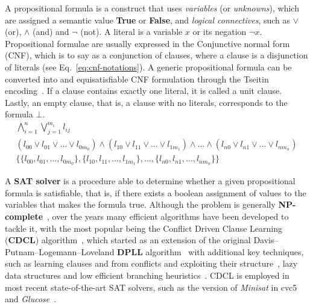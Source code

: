 \documentclass[runningheads]{llncs}
\begin{document}
A propositional formula is a construct that uses \textit{variables} (or \textit{unknowns}), which are assigned a semantic value \textbf{True} or \textbf{False}, and \textit{logical connectives}, such as $\lor$ (or), $\land$ (and) and $\neg$ (not).
A literal is a variable $x$ or its negation $\neg x$.
Propositional formulae are usually expressed in the Conjunctive normal form (CNF), which is to say as a conjunction of clauses, where a clause is a disjunction of literals (see Eq.~\ref{eq:cnf-notations}).
A generic propositional formula can be converted into and equisatisfiable CNF formulation through the Tseitin encoding~\cite{ref:handbook-sat}.
If a clause contains exactly one literal, it is called a unit clause.
Lastly, an empty clause, that is, a clause with no literals, corresponds to the formula $\bot$.
\begin{equation}
    \label{eq:cnf-notations}
    \begin{gathered}
        \bigwedge_{i=1}^n \bigvee_{j=1}^{m_i} l_{ij} \\
        ( l_{00} \lor l_{01} \lor \dots \lor l_{0m_0}) \land (l_{10} \lor l_{11} \lor \dots \lor l_{1m_1}) \land \dots \land (l_{n0} \lor l_{n1} \lor \dots \lor l_{nm_n}) \\
        \{ \{ l_{00}, l_{01} , \dots , l_{0m_0} \} , \{ l_{10} , l_{11} , \dots , l_{1m_1} \}, \dots , \{ l_{n0} , l_{n1} , \dots , l_{nm_n} \} \}
    \end{gathered}
\end{equation}

A \textbf{SAT solver} is a procedure able to determine whether a given propositional formula is satisfiable, that is, if there exists a boolean assignment of values to the variables that makes the formula true.
Although the problem is generally \textbf{NP-complete}~\cite{ref:np-sat}, over the years many efficient algorithms have been developed to tackle it, with the most popular being the Conflict Driven Clause Learning (\textbf{CDCL}) algorithm~\cite{ref:handbook-sat}, which started as an extension of the original Davis–Putnam–Logemann–Loveland \textbf{DPLL} algorithm~\cite{ref:dpll} with additional key techniques, such as learning clauses and from conflicts and exploiting their structure~\cite{ref:conflict-driven-clause-learning}, lazy data structures and low efficient branching heuristics~\cite{ref:watched-literals}.
CDCL is employed in most recent state-of-the-art SAT solvers, such as the version of \textit{Minisat} in cvc5~\cite{ref:cvc5-smt-comp-2022} and \textit{Glucose}~\cite{ref:glucose}.
\end{document}
